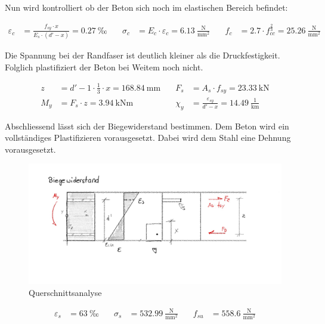 \documentclass[
  11pt,
  letterpaper,
]{scrreprt}
\begin{document}
Nun wird kontrolliert ob der Beton sich noch im elastischen Bereich
befindet:

\[
\begin{aligned}
\varepsilon_{c}& = \frac{f_{sy} \cdot x}{E_{s} \cdot \left({d}' - x\right)} = 0.27 \ \mathrm{‰} \quad & \sigma_{c}& = E_{c} \cdot \varepsilon_{c} = 6.13 \ \frac{\mathrm{N}}{\mathrm{mm}^{2}} \quad & f_{c}& = 2.7 \cdot f_{cc}^{\frac{2}{3}} = 25.26 \ \frac{\mathrm{N}}{\mathrm{mm}^{2}} \end{aligned}
\]

Die Spannung bei der Randfaser ist deutlich kleiner als die
Druckfestigkeit. Folglich plastifiziert der Beton bei Weitem noch nicht.

\[
\begin{aligned}
z& = {d}' - 1 \cdot \frac{1}{3} \cdot x = 168.84 \ \mathrm{mm} \quad & F_{s}& = A_{s} \cdot f_{sy} = 23.33 \ \mathrm{kN} \\ 
M_{y}& = F_{s} \cdot z = 3.94 \ \mathrm{kNm} \quad & \chi_{y}& = \frac{\varepsilon_{sy}}{{d}' - x} = 14.49 \ \frac{1}{\mathrm{km}} \end{aligned}
\]

Abschliessend lässt sich der Biegewiderstand bestimmen. Dem Beton wird
ein vollständiges Plastifizieren vorausgesetzt. Dabei wird dem Stahl
eine Dehnung vorausgesetzt.

\begin{figure}[H]

{\centering \includegraphics{../imgs/thesis_skizzen-3.jpg}

}

\caption{Querschnittsanalyse}

\end{figure}%

\[
\begin{aligned}
\varepsilon_{s}& = 63 \ \mathrm{‰} \quad & \sigma_{s}& = 532.99 \ \frac{\mathrm{N}}{\mathrm{mm}^{2}} \quad & f_{su}& = 558.6 \ \frac{\mathrm{N}}{\mathrm{mm}^{2}} \end{aligned}
\]
\end{document}
